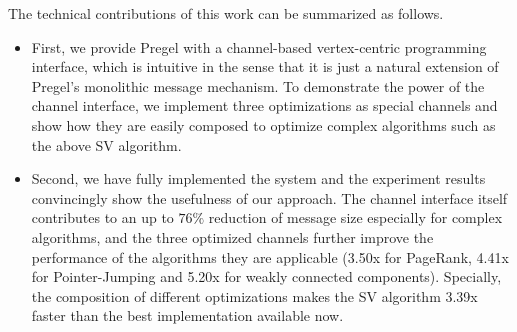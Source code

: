 \documentclass{sokendai_thesis} %
\begin{document}
The technical contributions of this work can be summarized as follows.
\begin{itemize}
\item First, we provide Pregel with a channel-based vertex-centric programming interface, which is intuitive in the sense that it is just a natural extension of Pregel's monolithic message mechanism.
To demonstrate the power of the channel interface, we implement three optimizations as special channels and show how they are easily composed to optimize complex algorithms such as the above SV algorithm.


\item Second, we have fully implemented the system and the experiment results convincingly show the usefulness of our approach.
The channel interface itself contributes to an up to $76\%$ reduction of message size especially for complex algorithms, and the three optimized channels further improve the performance of the algorithms they are applicable (3.50x for PageRank, 4.41x for Pointer-Jumping and 5.20x for weakly connected components).
Specially, the composition of different optimizations makes the SV algorithm 3.39x faster than the best implementation available now.
\end{itemize}
\end{document}
